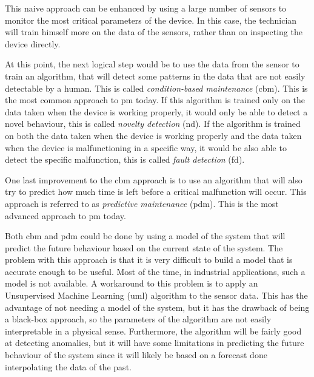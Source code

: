 This naive approach can be enhanced by using a large number of sensors to monitor the most critical parameters of the device. In this case, the technician will train himself more on the data of the sensors, rather than on inspecting the device directly. 

At this point, the next logical step would be to use the data from the sensor to train an algorithm, that will detect some patterns in the data that are not easily detectable by a human. This is called \emph{condition-based maintenance} (\gls{cbm}). This is the most common approach to \gls{pm} today. If this algorithm is trained only on the data taken when the device is working properly, it would only be able to detect a novel behaviour, this is called \emph{novelty detection} (\gls{nd}). If the algorithm is trained on both the data taken when the device is working properly and the data taken when the device is malfunctioning in a specific way, it would be also able to detect the specific malfunction, this is called \emph{fault detection} (\gls{fd}).

One last improvement to the \gls{cbm} approach is to use an algorithm that will also try to predict how much time is left before a critical malfunction will occur. This approach is referred to as \emph{predictive maintenance} (\gls{pdm}). This is the most advanced approach to \gls{pm} today.

Both \gls{cbm} and \gls{pdm} could be done by using a model of the system that will predict the future behaviour based on the current state of the system. The problem with this approach is that it is very difficult to build a model that is accurate enough to be useful. Most of the time, in industrial applications, such a model is not available.
A workaround to this problem is to apply an Unsupervised Machine Learning (\gls{uml}) algorithm to the sensor data. This has the advantage of not needing a model of the system, but it has the drawback of being a black-box approach, so the parameters of the algorithm are not easily interpretable in a physical sense. Furthermore, the algorithm will be fairly good at detecting anomalies, but it will have some limitations in predicting the future behaviour of the system since it will likely be based on a forecast done interpolating the data of the past.

